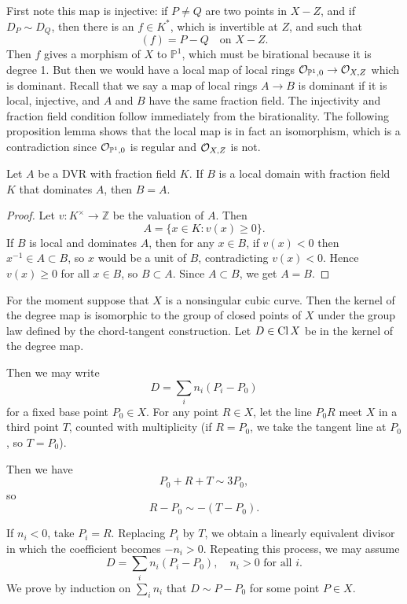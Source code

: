 \documentclass[12pt]{article}
\begin{document}
\begin{example}
    First note this map is injective: if $P \neq Q$ are two points in $X - Z$, and if $D_P \sim D_Q$, then there is an $f \in K^*$, which is invertible at $Z$, and such that
    \[
        (f) = P - Q \quad \text{on } X - Z.
    \]
    Then $f$ gives a morphism of $X$ to $\mathbb{P}^1$, which must be birational because it is degree 1. But then we would have a local map of local rings ${\mathcal{O}}_{\mathbb{P}^1,0} \to {\mathcal{O}}_{X,Z}$ which is dominant. Recall that we say a map of local rings $A \to B$ is dominant if it is local, injective, and $A$ and $B$ have the same fraction field. The injectivity and fraction field condition follow immediately from the birationality. The following proposition lemma shows that the local map is in fact an isomorphism, which is a contradiction since ${\mathcal{O}}_{\mathbb{P}^1,0}$ is regular and ${\mathcal{O}}_{X,Z}$ is not.
    \begin{proposition}
        Let $A$ be a DVR with fraction field $K$. If $B$ is a local domain with fraction field $K$ that dominates $A$, then $B = A$.
    \end{proposition}

    \begin{proof}
        Let $v:K^\times\to \mathbb Z$ be the valuation of $A$. Then
        \[
            A=\{x\in K: v(x)\ge 0\}.
        \]
        If $B$ is local and dominates $A$, then for any $x\in B$, if $v(x)<0$ then $x^{-1}\in A\subset B$, so $x$ would be a unit of $B$, contradicting $v(x)<0$. Hence $v(x)\ge 0$ for all $x\in B$, so $B\subset A$. Since $A\subset B$, we get $A=B$.
    \end{proof}

    For the moment suppose that $X$ is a nonsingular cubic curve. Then the kernel of the degree map is isomorphic to the group of closed points of $X$ under the group law defined by the chord-tangent construction. Let $D \in \operatorname{Cl} X$ be in the kernel of the degree map.

    Then we may write
    \[
        D = \sum_i n_i (P_i - P_0)
    \]
    for a fixed base point $P_0 \in X$.
    For any point $R \in X$, let the line $P_0R$ meet $X$ in a third point $T$, counted with multiplicity (if $R=P_0$, we take the tangent line at $P_0$, so $T=P_0$).

    Then we have
    \[
        P_0 + R + T \sim 3P_0,
    \]
    so
    \[
        R - P_0 \sim -(T - P_0).
    \]

    If $n_i < 0$, take $P_i = R$. Replacing $P_i$ by $T$, we obtain a linearly equivalent divisor in which the coefficient becomes $-n_i > 0$. Repeating this process, we may assume
    \[
        D = \sum_i n_i (P_i - P_0), \quad n_i > 0 \text{ for all } i.
    \]
    We prove by induction on $\sum_i n_i$ that $D \sim P - P_0$
    for some point $P \in X$.


\end{example}
\end{document}
